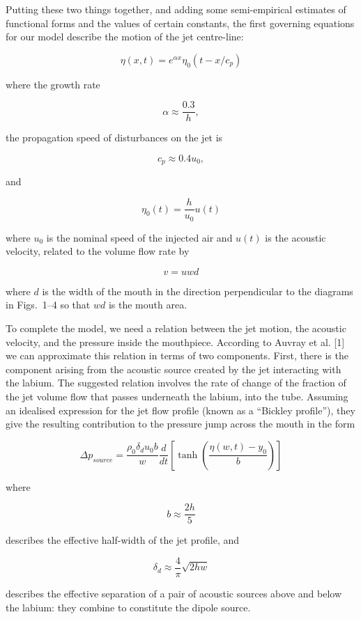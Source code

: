   Putting these two things together, and adding some semi-empirical estimates 
  of functional forms and the values of certain constants, the first governing 
  equations for our model describe the motion of the jet centre-line: 

  $$\eta(x,t)=e^{\alpha x} \eta_0(t-x/c_p) \tag{1}$$ 

  where the growth rate 

  $$\alpha \approx \dfrac{0.3}{h}, \tag{2}$$ 

  the propagation speed of disturbances on the jet is 

  $$c_p \approx 0.4 u_0 , \tag{3}$$ 

  and 

  $$\eta_0(t)=\dfrac{h}{u_0} u(t) \tag{4}$$ 

  where $u_0$ is the nominal speed of the injected air and $u(t)$ is the 
  acoustic velocity, related to the volume flow rate by 

  $$v=u w d \tag{5}$$ 

  where $d$ is the width of the mouth in the direction perpendicular to the 
  diagrams in Figs.\ 1--4 so that $wd$ is the mouth area. 

  To complete the model, we need a relation between the jet motion, the 
  acoustic velocity, and the pressure inside the mouthpiece. According to 
  Auvray et al. [1] we can approximate this relation in terms of two 
  components. First, there is the component arising from the acoustic source 
  created by the jet interacting with the labium. The suggested relation 
  involves the rate of change of the fraction of the jet volume flow that 
  passes underneath the labium, into the tube. Assuming an idealised expression 
  for the jet flow profile (known as a ``Bickley profile''), they give the 
  resulting contribution to the pressure jump across the mouth in the form 

  $$\Delta p_{source}=\dfrac{\rho_0 \delta_d u_0 b}{w} \dfrac{d}{dt} \left[ 
  \tanh \left( \dfrac{\eta(w,t)-y_0}{b} \right) \right] \tag{6}$$ 

  where 

  $$b \approx \dfrac{2h}{5} \tag{7}$$ 

  describes the effective half-width of the jet profile, and 

  $$\delta_d \approx \dfrac{4}{\pi}\sqrt{2 h w} \tag{8}$$ 

  describes the effective separation of a pair of acoustic sources above and 
  below the labium: they combine to constitute the dipole source. 


